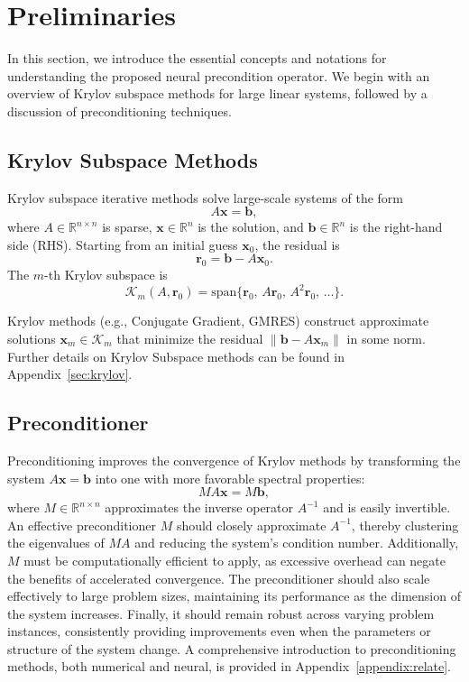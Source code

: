 \section{Preliminaries}
In this section, we introduce the essential concepts and notations for understanding the proposed neural precondition operator. We begin with an overview of Krylov subspace methods for large linear systems, followed by a discussion of preconditioning techniques.

\subsection{Krylov Subspace Methods}
Krylov subspace iterative methods solve large-scale systems of the form
\begin{equation}
    A\mathbf{x} = \mathbf{b},
\end{equation}
where \(A \in \mathbb{R}^{n \times n}\) is sparse, \(\mathbf{x}\in \mathbb{R}^n\) is the solution, and \(\mathbf{b}\in \mathbb{R}^n\) is the right-hand side (RHS). Starting from an initial guess \(\mathbf{x}_0\), the residual is 
\begin{equation}
    \mathbf{r}_0 = \mathbf{b} - A\mathbf{x}_0.
\end{equation}
The \(m\)-th Krylov subspace is
\begin{equation}
    \mathcal{K}_m(A, \mathbf{r}_0) = \text{span}\{\mathbf{r}_0,\, A\mathbf{r}_0,\, A^2\mathbf{r}_0,\, \dots\}.
\end{equation}

Krylov methods (e.g., Conjugate Gradient, GMRES) construct approximate solutions \(\mathbf{x}_m \in \mathcal{K}_m\) that minimize the residual \(\|\mathbf{b} - A\mathbf{x}_m\|\) in some norm. Further details on Krylov Subspace methods can be found in Appendix~\ref{sec:krylov}.

\subsection{Preconditioner}
Preconditioning improves the convergence of Krylov methods by transforming the system \(A\mathbf{x} = \mathbf{b}\) into one with more favorable spectral properties:
\begin{equation}
    M A \mathbf{x} = M \mathbf{b},
\end{equation}
where \(M \in \mathbb{R}^{n \times n}\) approximates the inverse operator \(A^{-1}\) and is easily invertible. An effective preconditioner \(M\) should closely approximate \(A^{-1}\), thereby clustering the eigenvalues of \(M A\) and reducing the system's condition number. Additionally, \(M\) must be computationally efficient to apply, as excessive overhead can negate the benefits of accelerated convergence. The preconditioner should also scale effectively to large problem sizes, maintaining its performance as the dimension of the system increases. Finally, it should remain robust across varying problem instances, consistently providing improvements even when the parameters or structure of the system change. A comprehensive introduction to preconditioning methods, both numerical and neural, is provided in Appendix~\ref{appendix:relate}.

